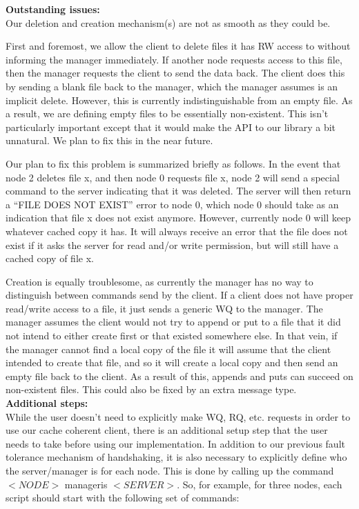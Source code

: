 \documentclass[11pt]{article}
\begin{document}
\textbf{Outstanding issues:} \\

Our deletion and creation mechanism(s) are not as smooth as they could be.

First and foremost, we allow the client to delete files it has RW access to without informing the manager immediately. If another node requests
access to this file, then the manager requests the client to send the data back. The client does this by sending a blank file back to the 
manager, which the manager assumes is an implicit delete. However, this is currently indistinguishable from an empty file. As a result, we are defining
empty files to be essentially non-existent. This isn't particularly important except that it would make the API to our library a bit unnatural.
We plan to fix this in the near future.

Our plan to fix this problem is summarized briefly as follows. In the event that node 2 deletes file x, and then node 0 requests file x, node 2 will send a 
special command to the server indicating that it was deleted. The server will then return a “FILE DOES NOT EXIST” error to node 0, which node 0 should 
take as an indication that file x does not exist anymore. However, currently node 0 will keep whatever cached copy it has. It will always receive 
an error that the file does not exist if it asks the server for read and/or write permission, but will still have a cached copy of file x.

Creation is equally troublesome, as currently the manager has no way to distinguish between commands send by the client. If a client does not have 
proper read/write access to a file, it just sends a generic WQ to the manager. The manager assumes the client would not try to append or put to a file that it did not intend to either create first
or that existed somewhere else. In that vein, if the manager cannot find a local copy of the file
it will assume that the client intended to create that file, and so it will create a local
copy and then send an empty file back to the client. As a result of this, appends and puts can succeed on non-existent files. This could also be fixed by an extra message type. \\

\textbf{Additional steps:} \\

While the user doesn’t need to explicitly make WQ, RQ, etc. requests in order to use our cache coherent client, there is an additional setup step 
that the user needs to take before using our implementation. In addition to our previous fault tolerance mechanism of handshaking, it is also necessary 
to explicitly define who the server/manager is for each node. This is done by calling up the command $<NODE>$ manageris $<SERVER>$. So, for example, for three 
nodes, each script should start with the following set of commands:\\
\end{document}
